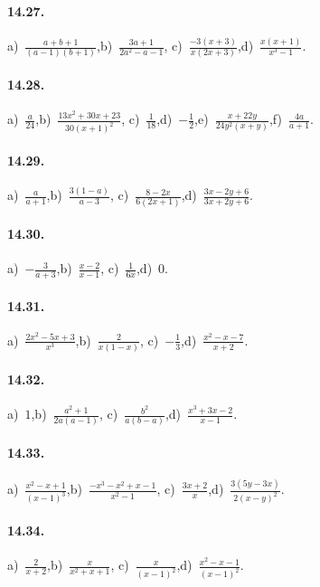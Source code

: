 \paragraph{14.27.}
a)~$\frac{a+b+1}{(a-1)(b+1)}$,\quad b)~$\frac{3a+1}{2a^{2}-a-1}$, \quad c)~$\frac{-3(x+3)}{x(2x+3)}$,\quad d)~$\frac{x(x+1)}{x^{3}-1}$.

\paragraph{14.28.}
a)~$\frac{a}{24}$,\quad b)~$\frac{13x^{2}+30x+23}{30(x+1)^{2}}$, \quad c)~$\frac{1}{18}$,\quad d)~$-\frac{1}{2}$,\quad e)~$\frac{x+22y}{24y^{2}(x+y)}$,\quad f)~$\frac{4a}{a+1}$.

\paragraph{14.29.}
a)~$\frac{a}{a+1}$,\quad b)~$\frac{3(1-a)}{a-3}$, \quad c)~$\frac{8-2x}{6(2x+1)}$,\quad d)~$\frac{3x-2y+6}{3x+2y+6}$.

\paragraph{14.30.}
a)~$-\frac{3}{a+3}$,\quad b)~$\frac{x-2}{x-1}$, \quad c)~$\frac{1}{6x}$,\quad d)~$0$.

\paragraph{14.31.}
a)~$\frac{2x^{2}-5x+3}{x^{3}}$,\quad b)~$\frac{2}{x(1-x)}$, \quad c)~$-{\frac{1}{3}}$,\quad d)~$\frac{x^{2}-x-7}{x+2}$.

\paragraph{14.32.}
a)~$1$,\quad b)~$\frac{a^{2}+1}{2a(a-1)}$, \quad c)~$\frac{b^{2}}{a(b-a)}$,\quad d)~$\frac{x^{3}+3x-2}{x-1}$.

\paragraph{14.33.}
a)~$\frac{x^{2}-x+1}{(x-1)^{3}}$,\quad b)~$\frac{-x^{3}-x^{2}+x-1}{x^{2}-1}$, \quad c)~$\frac{3x+2}{x}$,\quad d)~$\frac{3(5y-3x)}{2(x-y)^{2}}$.

\paragraph{14.34.}
a)~$\frac{2}{x+2}$,\quad b)~$\frac{x}{x^{2}+x+1}$, \quad c)~$\frac{x}{(x-1)^{2}}$,\quad d)~$\frac{x^{2}-x-1}{(x-1)^{2}}$.

